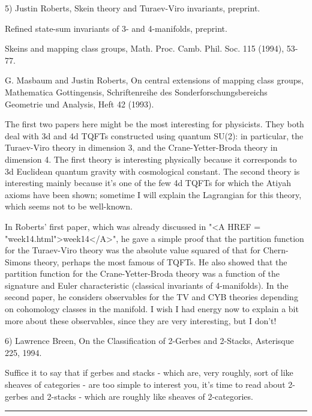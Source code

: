 5) Justin Roberts, Skein theory and Turaev-Viro invariants, preprint.

Refined state-sum invariants of 3- and 4-manifolds, preprint.

Skeins and mapping class groups, Math. Proc. Camb. Phil. Soc. 115 (1994),  
53-77.

G. Masbaum and Justin Roberts, On central extensions of mapping class groups,
Mathematica Gottingensis, Schriftenreihe des Sonderforschungsbereichs Geometrie
und Analysis, Heft 42 (1993).

The first two papers here might be the most interesting for physicists.  
They both deal with 3d and 4d TQFTs constructed using quantum SU(2): 
in particular, the Turaev-Viro theory in dimension 3, and the 
Crane-Yetter-Broda theory in dimension 4.  The first theory is interesting 
physically because it corresponds to 3d Euclidean quantum gravity with 
cosmological constant.  The second theory is interesting mainly because 
it's one of the few 4d TQFTs for which the Atiyah axioms have been shown; 
sometime I will explain the Lagrangian for this theory, which seems not to 
be well-known.   

In Roberts' first paper, which was already discussed in "<A HREF =
"week14.html">week14</A>", he gave a simple proof that the partition
function for the Turaev-Viro theory was the absolute value squared of
that for Chern-Simons theory, perhaps the most famous of TQFTs.  He also
showed that the partition function for the Crane-Yetter-Broda theory was
a function of the signature and Euler characteristic (classical
invariants of 4-manifolds).  In the second paper, he considers
observables for the TV and CYB theories depending on cohomology classes
in the manifold.  I wish I had energy now to explain a bit more about
these observables, since they are very interesting, but I don't!

6) Lawrence Breen, On the Classification of 2-Gerbes and 2-Stacks, 
Asterisque 225, 1994.

Suffice it to say that if gerbes and stacks - which are, very roughly, 
sort of like sheaves of categories - are too simple to interest
you, it's time to read about 2-gerbes and 2-stacks - which are 
roughly like sheaves of 2-categories.  


\par\noindent\rule{\textwidth}{0.4pt}


